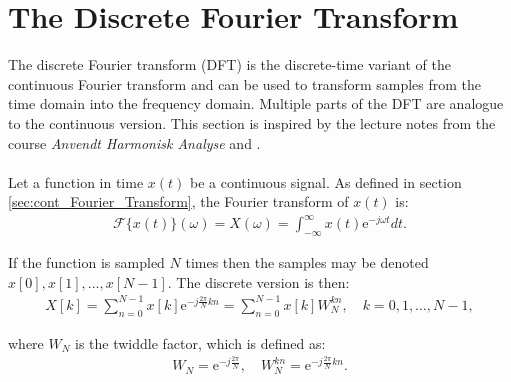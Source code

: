 \section{The Discrete Fourier Transform} \label{sec:DFT}
The discrete Fourier transform (DFT) is the discrete-time variant of the continuous Fourier transform and can be used to transform samples from the time domain into the frequency domain. Multiple parts of the DFT are analogue to the continuous version. This section is inspired by the lecture notes from the course \textit{Anvendt Harmonisk Analyse} and \cite{page 252-264, FSP}.
\\ \\
Let a function in time $x(t)$ be a continuous signal. As defined in section \ref{sec:cont_Fourier_Transform}, the Fourier transform of $x(t)$ is:
\begin{align*}
\mathcal{F}\{x(t)\}(\omega) = X(\omega) = \int_{-\infty}^\infty x(t)\text{e}^{-j\omega t} dt.
\end{align*}

If the function is sampled $N$ times then the samples may be denoted $x[0],x[1],\dots,x[N-1]$. The discrete version is then:
\begin{align} \label{eq:DFT_vectors}
X[k] = \sum_{n=0}^{N-1} x[k]\text{e}^{-j\frac{2\pi}{N}kn} = \sum_{n=0}^{N-1} x[k] W_N^{kn}, \quad k = 0, 1, \dots, N-1,
\end{align}

where $W_N$ is the twiddle factor, which is defined as:
\begin{align*}
W_N = \text{e}^{-j\frac{2 \pi}{N}}, \quad W_N^{kn} = \text{e}^{-j\frac{2 \pi}{N}kn}.
\end{align*}

